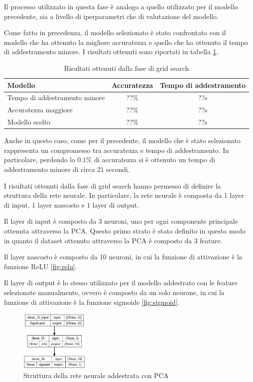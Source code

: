 Il processo utilizzato in questa fase è analogo a quello utilizzato per il modello
precedente, sia a livello di iperparametri che di valutazione del modello.

Come fatto in precedenza, il modello selezionato è stato confrontato con il modello
che ha ottenuto la migliore accuratezza e quello che ha ottenuto il tempo di
addestramento minore. I risultati ottenuti sono riportati in tabella \ref{tab:ris-grid-search-pca}.

\begin{table}[ht]
    \centering
    \begin{tabular}{@{}lcc@{}}
        \toprule
        \rowcolor[HTML]{EFEFEF}
        \textbf{Modello}              & \textbf{Accuratezza} & \textbf{Tempo di addestramento} \\ \midrule
        Tempo di addestramento minore & ??\%               & ??s                           \\
        Accuratezza maggiore          & ??\%               & ??s                          \\
        Modello scelto                & ??\%               & ??s                           \\ \bottomrule
    \end{tabular}
    \caption{Risultati ottenuti dalla fase di grid search}
    \label{tab:ris-grid-search-pca}
\end{table}
Anche in questo caso, come per il precedente, il modello che è stato selezionato
rappresenta un compromesso tra accuratezza e tempo di addestramento. In particolare,
perdendo lo $0.1\%$ di accuratezza si è ottenuto un tempo di addestramento minore
di circa $21$ secondi.


I risultati ottenuti dalla fase di grid search hanno permesso di definire la
struttura della rete neurale. In particolare, la rete neurale è composta da 1
layer di input, 1 layer nascosto e 1 layer di output.

Il layer di input è composto da 3 neuroni, uno per ogni componente principale
ottenuta attraverso la PCA. Questo primo strato è stato definito in questo modo
in quanto il dataset ottenuto attraverso la PCA è composto da 3 feature.

Il layer nascosto è composto da 10 neuroni, in cui la funzione di attivazione è
la funzione ReLU \ref{fig:relu}.

Il layer di output è lo stesso utilizzato per il modello addestrato con le feature
selezionate manualmente, ovvero è composto da un solo neurone, in cui la funzione
di attivazione è la funzione sigmoide \ref{fig:sigmoid}.
\begin{figure}[!ht]
    \centering
    \includegraphics[width=0.3\textwidth]{img/rete/struttura_rete_pca.png}
    \caption{Struttura della rete neurale addestrata con PCA}
    \label{fig:strutturaReteNeuralePCA}
\end{figure}